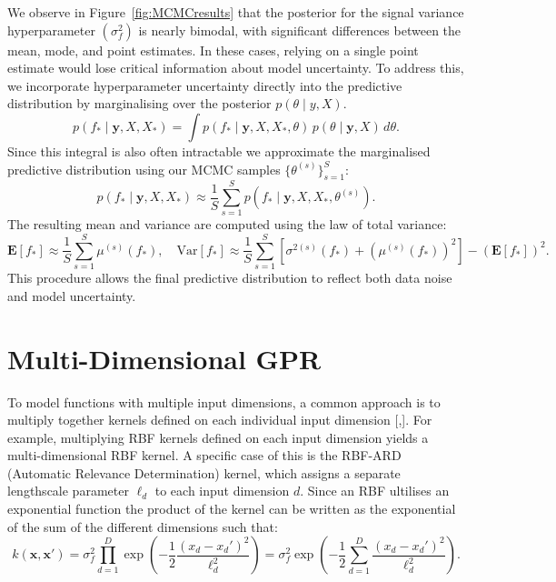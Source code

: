 \documentclass{ucdgradtaughtthesis}
\begin{document}
We observe in Figure~\ref{fig:MCMCresults} that the posterior for the signal variance hyperparameter \((\sigma_f^2)\) is nearly bimodal, with significant differences between the mean, mode, and point estimates. 
In these cases, relying on a single point estimate would lose critical information about model uncertainty.
To address this, we incorporate hyperparameter uncertainty directly into the predictive distribution by marginalising over the posterior \( p(\theta \mid y, X) \).
%
\begin{equation}
p(f_* \mid \mathbf{y}, X, X_*) = \int p(f_* \mid \mathbf{y}, X, X_*, \theta) \, p(\theta \mid \mathbf{y}, X) \, d\theta.
\end{equation}
Since this integral is also often intractable we approximate the marginalised predictive distribution using our MCMC samples \( \{\theta^{(s)}\}_{s=1}^S \):
%
\begin{equation}
p(f_* \mid \mathbf{y}, X, X_*) \approx \frac{1}{S} \sum_{s=1}^{S} p(f_* \mid \mathbf{y}, X, X_*, \theta^{(s)}).
\end{equation}
%
The resulting mean and variance are computed using the law of total variance:
%
\begin{equation}
\mathbf{E}[f_*] \approx \frac{1}{S} \sum_{s=1}^{S} \mu^{(s)}(f_*), \quad
\text{Var}[f_*] \approx \frac{1}{S} \sum_{s=1}^{S} \left[ \sigma^{2(s)}(f_*) + \left(\mu^{(s)}(f_*)\right)^2 \right] - \left( \mathbf{E}[f_*] \right)^2.
\end{equation}
This procedure allows the final predictive distribution to reflect both data noise and model uncertainty.


\section{Multi-Dimensional GPR}
\label{sec:multidims}
To model functions with multiple input dimensions, a common approach is to multiply together kernels defined on each individual input dimension [\cite{bible},\cite{gprthesis}]. For example, multiplying RBF kernels defined on each input dimension yields a multi-dimensional RBF kernel.
A specific case of this is the RBF-ARD (Automatic Relevance Determination) kernel, which assigns a separate lengthscale parameter \( \ell_d \) to each input dimension \( d \). Since an RBF ultilises an exponential function
the product of the kernel can be written as the exponential of the sum of the different dimensions such that:
\begin{equation}
    k(\mathbf{x}, \mathbf{x}') 
    = \sigma_f^2 \prod_{d=1}^D \exp\left( -\frac{1}{2} \frac{(x_d - x_d')^2}{\ell_d^2} \right)
    = \sigma_f^2 \exp\left( -\frac{1}{2} \sum_{d=1}^D \frac{(x_d - x_d')^2}{\ell_d^2} \right).
\end{equation}
%
\end{document}
